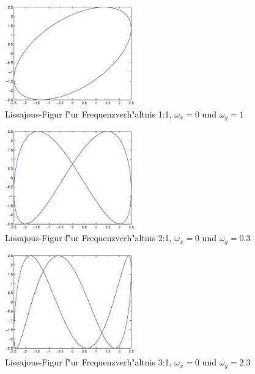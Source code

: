 \documentclass[10pt]{scrartcl}
\begin{document}
\begin{figure}
\includegraphics[width=0.5\textwidth]{1-1.eps}
\caption{Lissajous-Figur f"ur Frequenzverh"altnis 1:1, $\omega_x=0$ und $\omega_y=1$}
\label{fig:1:1}
\end{figure}

\begin{figure}
\includegraphics[width=0.5\textwidth]{2-1.eps}
\caption{Lissajous-Figur f"ur Frequenzverh"altnis 2:1, $\omega_x=0$ und $\omega_y=0.3$}
\label{fig:2:1}
\end{figure}

\begin{figure}
\includegraphics[width=0.5\textwidth]{3-1.eps}
\caption{Lissajous-Figur f"ur Frequenzverh"altnis 3:1, $\omega_x=0$ und $\omega_y=2.3$}
\label{fig:3:1}
\end{figure}
\end{document}
